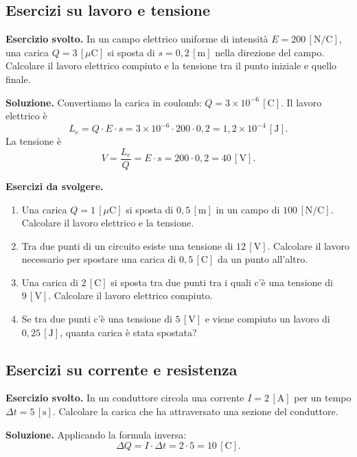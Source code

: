 \subsection{Esercizi su lavoro e tensione}

\begin{esercizio}
\textbf{Esercizio svolto.} In un campo elettrico uniforme di intensità \(E = 200\,[\text{N/C}]\), una carica \(Q = 3\,[\mu\text{C}]\) si sposta di \(s = 0{,}2\,[\text{m}]\) nella direzione del campo. Calcolare il lavoro elettrico compiuto e la tensione tra il punto iniziale e quello finale.

\smallskip
\textbf{Soluzione.} Convertiamo la carica in coulomb: \(Q = 3 \times 10^{-6}\,[\text{C}]\). Il lavoro elettrico è
\[
L_e = Q \cdot E \cdot s = 3 \times 10^{-6} \cdot 200 \cdot 0{,}2 = 1{,}2 \times 10^{-4}\,[\text{J}].
\]
La tensione è
\[
V = \frac{L_e}{Q} = E \cdot s = 200 \cdot 0{,}2 = 40\,[\text{V}].
\]
\end{esercizio}

\textbf{Esercizi da svolgere.}
\begin{enumerate}[leftmargin=1cm]
  \item Una carica \(Q = 1\,[\mu\text{C}]\) si sposta di \(0{,}5\,[\text{m}]\) in un campo di \(100\,[\text{N/C}]\). Calcolare il lavoro elettrico e la tensione.
  \item Tra due punti di un circuito esiste una tensione di \(12\,[\text{V}]\). Calcolare il lavoro necessario per spostare una carica di \(0{,}5\,[\text{C}]\) da un punto all'altro.
  \item Una carica di \(2\,[\text{C}]\) si sposta tra due punti tra i quali c'è una tensione di \(9\,[\text{V}]\). Calcolare il lavoro elettrico compiuto.
  \item Se tra due punti c'è una tensione di \(5\,[\text{V}]\) e viene compiuto un lavoro di \(0{,}25\,[\text{J}]\), quanta carica è stata spostata?
\end{enumerate}

\subsection{Esercizi su corrente e resistenza}

\begin{esercizio}
\textbf{Esercizio svolto.} In un conduttore circola una corrente \(I = 2\,[\text{A}]\) per un tempo \(\Delta t = 5\,[\text{s}]\). Calcolare la carica che ha attraversato una sezione del conduttore.

\smallskip
\textbf{Soluzione.} Applicando la formula inversa:
\[
\Delta Q = I \cdot \Delta t = 2 \cdot 5 = 10\,[\text{C}].
\]
\end{esercizio}

